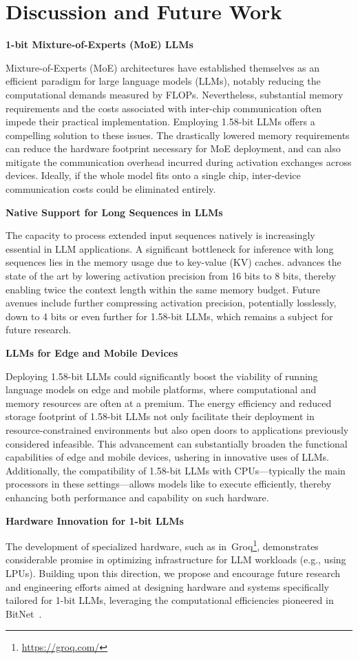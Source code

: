 \section{Discussion and Future Work}

\textbf{1-bit Mixture-of-Experts (MoE) LLMs}

Mixture-of-Experts (MoE) architectures have established themselves as an efficient paradigm for large language models (LLMs), notably reducing the computational demands measured by FLOPs. Nevertheless, substantial memory requirements and the costs associated with inter-chip communication often impede their practical implementation. Employing 1.58-bit LLMs offers a compelling solution to these issues. The drastically lowered memory requirements can reduce the hardware footprint necessary for MoE deployment, and can also mitigate the communication overhead incurred during activation exchanges across devices. Ideally, if the whole model fits onto a single chip, inter-device communication costs could be eliminated entirely.

\textbf{Native Support for Long Sequences in LLMs}

The capacity to process extended input sequences natively is increasingly essential in LLM applications. A significant bottleneck for inference with long sequences lies in the memory usage due to key-value (KV) caches.  advances the state of the art by lowering activation precision from 16 bits to 8 bits, thereby enabling twice the context length within the same memory budget. Future avenues include further compressing activation precision, potentially losslessly, down to 4 bits or even further for 1.58-bit LLMs, which remains a subject for future research.

\textbf{LLMs for Edge and Mobile Devices}

Deploying 1.58-bit LLMs could significantly boost the viability of running language models on edge and mobile platforms, where computational and memory resources are often at a premium. The energy efficiency and reduced storage footprint of 1.58-bit LLMs not only facilitate their deployment in resource-constrained environments but also open doors to applications previously considered infeasible. This advancement can substantially broaden the functional capabilities of edge and mobile devices, ushering in innovative uses of LLMs. Additionally, the compatibility of 1.58-bit LLMs with CPUs—typically the main processors in these settings—allows models like  to execute efficiently, thereby enhancing both performance and capability on such hardware.

\textbf{Hardware Innovation for 1-bit LLMs}

The development of specialized hardware, such as in~Groq\footnote{\url{https://groq.com/}}, demonstrates considerable promise in optimizing infrastructure for LLM workloads (e.g., using LPUs). Building upon this direction, we propose and encourage future research and engineering efforts aimed at designing hardware and systems specifically tailored for 1-bit LLMs, leveraging the computational efficiencies pioneered in BitNet~\cite{bitnet}.